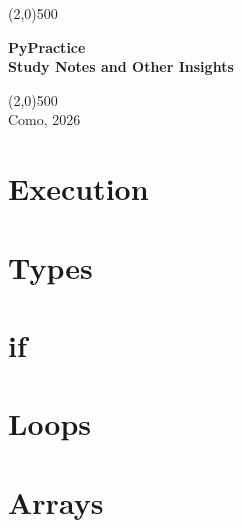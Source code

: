 \documentclass[a4paper,12pt,titlepage]{article} %
\begin{document}
\begin{titlepage}

\line(2,0){500}

\vspace{30pt}

\begin{center}
{\Huge \textbf{PyPractice}}\\
\vspace{40pt}
{\huge \textbf{Study Notes and Other Insights}}\\
\end{center}


\vspace{\fill}
\begin{center}
\line(2,0){500}\\
Como, 2026
\end{center}

\end{titlepage}

\tableofcontents

\newpage
\section{Execution}

\newpage
\section{Types}

\newpage
\section{if}

\newpage
\section{Loops}

\newpage
\section{Arrays}

\newpage
\end{document}
